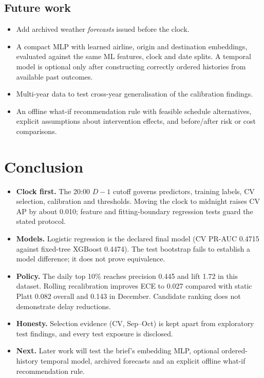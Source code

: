 \documentclass[conference]{IEEEtran}
\begin{document}
\subsection{Future work}
\begin{itemize}
\item Add archived weather \emph{forecasts} issued before the clock.
\item A compact MLP with learned airline, origin and destination embeddings, evaluated against the same ML features, clock and date splits. A temporal model is optional only after constructing correctly ordered histories from available past outcomes.
\item Multi-year data to test cross-year generalisation of the calibration findings.
\item An offline what-if recommendation rule with feasible schedule alternatives, explicit assumptions about intervention effects, and before/after risk or cost comparisons.
\end{itemize}

\section{Conclusion}\label{sec:conclusion}
\begin{itemize}
\item \textbf{Clock first.} The 20:00 $D-1$ cutoff governs predictors, training labels, CV selection, calibration and thresholds. Moving the clock to midnight raises CV AP by about 0.010; feature and fitting-boundary regression tests guard the stated protocol.
\item \textbf{Models.} Logistic regression is the declared final model (CV PR-AUC 0.4715 against fixed-tree XGBoost 0.4474). The test bootstrap fails to establish a model difference; it does not prove equivalence.
\item \textbf{Policy.} The daily top 10\% reaches precision 0.445 and lift 1.72 in this dataset. Rolling recalibration improves ECE to 0.027 compared with static Platt 0.082 overall and 0.143 in December. Candidate ranking does not demonstrate delay reductions.
\item \textbf{Honesty.} Selection evidence (CV, Sep--Oct) is kept apart from exploratory test findings, and every test exposure is disclosed.
\item \textbf{Next.} Later work will test the brief's embedding MLP, optional ordered-history temporal model, archived forecasts and an explicit offline what-if recommendation rule.
\end{itemize}
\end{document}
